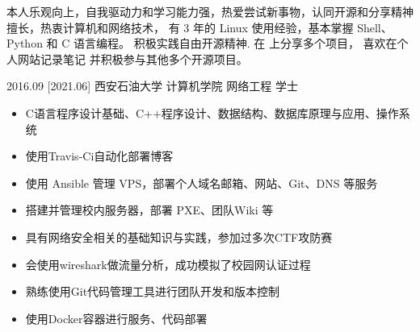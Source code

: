 \documentclass[zh]{resume}
\begin{document}
\makeheader

{\onehalfspacing\hspace{2em}%
本人乐观向上，自我驱动力和学习能力强，热爱尝试新事物，认同开源和分享精神
擅长，热衷计算机和网络技术，
有 3 年的 Linux 使用经验，基本掌握 Shell、Python 和 C 语言编程。
积极实践自由开源精神.
在  上分享多个项目，
喜欢在个人网站记录笔记
并积极参与其他多个开源项目。
\par}

\begin{competences}
\end{competences}

\begin{educations}
  \education%
    {2016.09}%
    [2021.06]%
    {西安石油大学}%
    {计算机学院}%
    {网络工程}%
    {学士}
\end{educations}
\begin{itemize}
  \item C语言程序设计基础、C++程序设计、数据结构、数据库原理与应用、操作系统
\end{itemize}
\begin{itemize}
  \item 使用Travis-Ci自动化部署博客
  \item 使用 Ansible 管理 VPS，部署个人域名邮箱、网站、Git、DNS 等服务
  \item 搭建并管理校内服务器，部署 PXE、团队Wiki 等
  \item 具有网络安全相关的基础知识与实践，参加过多次CTF攻防赛
  \item 会使用wireshark做流量分析，成功模拟了校园网认证过程
  \item 熟练使用Git代码管理工具进行团队开发和版本控制
  \item 使用Docker容器进行服务、代码部署
\end{itemize}
\end{document}

